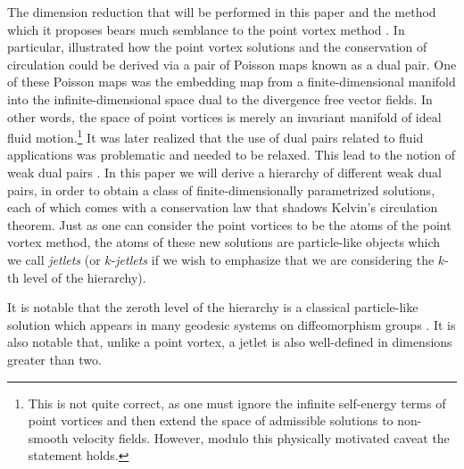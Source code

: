 \documentclass[12pt]{amsart}
\begin{document}
The dimension reduction that will be performed in this paper and the method which it proposes
bears much semblance to the point vortex method \cite{Chorin1973}.
In particular, \cite{MarsdenWeinstein1983} illustrated how the point vortex solutions and the conservation of circulation could be derived via a pair of Poisson maps known as a dual pair.
One of these Poisson maps was the embedding map from a finite-dimensional manifold into the infinite-dimensional space dual to the divergence free vector fields.
In other words, the space of point vortices is merely an invariant manifold of ideal fluid motion.\footnote{This is not quite correct, as one must ignore the infinite self-energy terms of point vortices and then extend the space of admissible solutions to non-smooth velocity fields.  However, modulo this physically motivated caveat the statement holds.}
It was later realized that the use of dual pairs related to fluid applications was problematic and needed to be relaxed.
This lead to the notion of weak dual pairs \cite{GayBalmazVizman2012}.
In this paper we will derive a hierarchy of different weak dual pairs, in order to obtain a class of finite-dimensionally parametrized solutions,
each of which comes with a conservation law that shadows Kelvin's circulation theorem.
Just as one can consider the point vortices to be the atoms of the point vortex method,
the atoms of these new solutions are particle-like objects which we call \emph{jetlets} (or $k$-\emph{jetlets} if we wish to emphasize that we are considering the $k$-th level of the hierarchy).

It is notable that the zeroth level of the hierarchy is a classical particle-like solution which appears in many geodesic
systems on diffeomorphism groups \cite{CamassaHolm1993,JoshiMiller2000,FringerHolm2001,MumfordMichor2013}.
It is also notable that, unlike a point vortex, a jetlet is also well-defined in dimensions greater than two.
\end{document}
